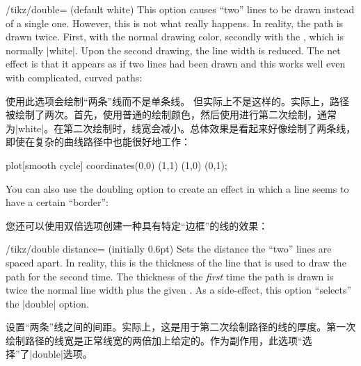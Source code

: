 \begin{key}{/tikz/double= (default white)}
    This option causes ``two'' lines to be drawn instead of a single one.
    However, this is not what really happens. In reality, the path is drawn
    twice. First, with the normal drawing color, secondly with the , which is normally |white|. Upon the second drawing, the line width
    is reduced. The net effect is that it appears as if two lines had been
    drawn and this works well even with complicated, curved paths:

    使用此选项会绘制“两条”线而不是单条线。
但实际上不是这样的。实际上，路径被绘制了两次。首先，使用普通的绘制颜色，然后使用进行第二次绘制，通常为|white|。在第二次绘制时，线宽会减小。总体效果是看起来好像绘制了两条线，即使在复杂的曲线路径中也能很好地工作：

\begin{codeexample}[]
\tikz \draw[double]
  plot[smooth cycle] coordinates{(0,0) (1,1) (1,0) (0,1)};
\end{codeexample}

    You can also use the doubling option to create an effect in which a line
    seems to have a certain ``border'':

    您还可以使用双倍选项创建一种具有特定“边框”的线的效果：

\begin{codeexample}[]
\end{codeexample}
\end{key}

\begin{key}{/tikz/double distance= (initially 0.6pt)}
    Sets the distance the ``two'' lines are spaced apart. In reality, this is
    the thickness of the line that is used to draw the path for the second
    time. The thickness of the \emph{first} time the path is drawn is twice the
    normal line width plus the given . As a side-effect, this
    option ``selects'' the |double| option.

    设置“两条”线之间的间距。实际上，这是用于第二次绘制路径的线的厚度。第一次绘制路径的线宽是正常线宽的两倍加上给定的。作为副作用，此选项“选择”了|double|选项。

\begin{codeexample}[]
\end{codeexample}
\end{key}

